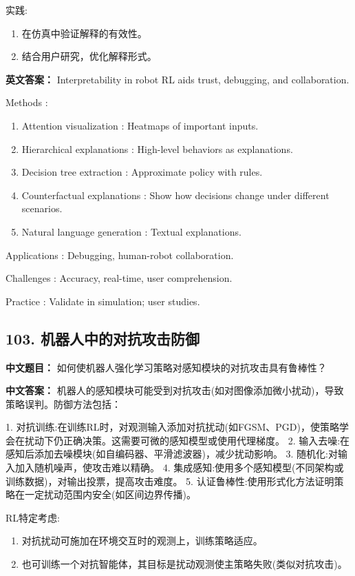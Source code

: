 \documentclass[10pt,a4paper]{ctexart}
\begin{document}
 实践:
\begin{enumerate}
    \item 在仿真中验证解释的有效性。
    \item 结合用户研究，优化解释形式。
\end{enumerate}

\textbf{英文答案：}  
Interpretability in robot RL aids trust, debugging, and collaboration.

 Methods :
\begin{enumerate}
    \item Attention visualization : Heatmaps of important inputs.
    \item Hierarchical explanations : High-level behaviors as explanations.
    \item Decision tree extraction : Approximate policy with rules.
    \item Counterfactual explanations : Show how decisions change under different scenarios.
    \item Natural language generation : Textual explanations.
\end{enumerate}

 Applications : Debugging, human-robot collaboration.

 Challenges : Accuracy, real-time, user comprehension.

 Practice : Validate in simulation; user studies.

\subsection*{103. 机器人中的对抗攻击防御}
\textbf{中文题目：} 如何使机器人强化学习策略对感知模块的对抗攻击具有鲁棒性？

\textbf{中文答案：}  
机器人的感知模块可能受到对抗攻击(如对图像添加微小扰动)，导致策略误判。防御方法包括：

1.  对抗训练:在训练RL时，对观测输入添加对抗扰动(如FGSM、PGD)，使策略学会在扰动下仍正确决策。这需要可微的感知模型或使用代理梯度。
2.  输入去噪:在感知后添加去噪模块(如自编码器、平滑滤波器)，减少扰动影响。
3.  随机化:对输入加入随机噪声，使攻击难以精确。
4.  集成感知:使用多个感知模型(不同架构或训练数据)，对输出投票，提高攻击难度。
5.  认证鲁棒性:使用形式化方法证明策略在一定扰动范围内安全(如区间边界传播)。

 RL特定考虑:
\begin{enumerate}
    \item 对抗扰动可施加在环境交互时的观测上，训练策略适应。
    \item 也可训练一个对抗智能体，其目标是扰动观测使主策略失败(类似对抗攻击)。
\end{enumerate}
\end{document}
